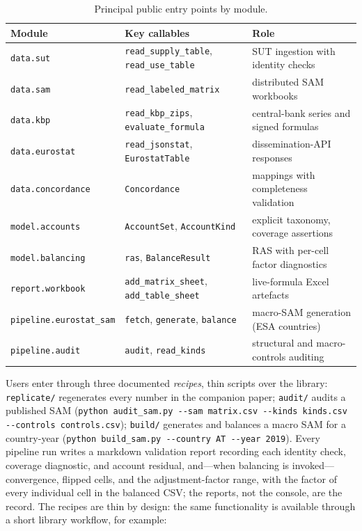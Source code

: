 \documentclass[11pt,a4paper]{article}
\begin{document}
\begin{table}[h]
\centering\small
\begin{tabularx}{\textwidth}{llX}
\toprule
Module & Key callables & Role \\
\midrule
\texttt{data.sut} & \texttt{read\_supply\_table}, \texttt{read\_use\_table} & SUT ingestion with identity checks \\
\texttt{data.sam} & \texttt{read\_labeled\_matrix} & distributed SAM workbooks \\
\texttt{data.kbp} & \texttt{read\_kbp\_zips}, \texttt{evaluate\_formula} & central-bank series and signed formulas \\
\texttt{data.eurostat} & \texttt{read\_jsonstat}, \texttt{EurostatTable} & dissemination-API responses \\
\texttt{data.concordance} & \texttt{Concordance} & mappings with completeness validation \\
\texttt{model.accounts} & \texttt{AccountSet}, \texttt{AccountKind} & explicit taxonomy, coverage assertions \\
\texttt{model.balancing} & \texttt{ras}, \texttt{BalanceResult} & RAS with per-cell factor diagnostics \\
\texttt{report.workbook} & \texttt{add\_matrix\_sheet}, \texttt{add\_table\_sheet} & live-formula Excel artefacts \\
\texttt{pipeline.eurostat\_sam} & \texttt{fetch}, \texttt{generate}, \texttt{balance} & macro-SAM generation (ESA countries) \\
\texttt{pipeline.audit} & \texttt{audit}, \texttt{read\_kinds} & structural and macro-controls auditing \\
\bottomrule
\end{tabularx}
\caption{Principal public entry points by module.}
\label{tab:modules}
\end{table}

Users enter through three documented \emph{recipes}, thin scripts over
the library: \texttt{replicate/} regenerates every number in the
companion paper; \texttt{audit/} audits a published SAM
(\texttt{python audit\_sam.py -{}-sam matrix.csv -{}-kinds kinds.csv
-{}-controls controls.csv}); \texttt{build/} generates and balances a
macro SAM for a country-year (\texttt{python build\_sam.py -{}-country
AT -{}-year 2019}). Every pipeline run writes a markdown validation report
recording each identity check, coverage diagnostic, and account
residual, and---when balancing is invoked---convergence, flipped cells,
and the adjustment-factor range, with the factor of every individual
cell in the balanced CSV; the reports, not the console, are the
record. The
recipes are thin by design: the same functionality is available through
a short library workflow, for example:
\end{document}
